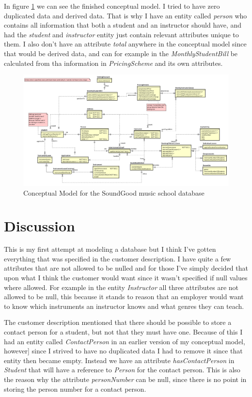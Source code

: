\documentclass[a4paper]{scrreprt}
\begin{document}
In figure \ref{fig:conceptualModel} we can see the finished conceptual model. I tried to have zero duplicated data and derived
data. That is why I have an entity called \textit{person} who contains all information that both a student and an instructor should have,
and had the \textit{student} and \textit{instructor} entity just contain relevant attributes unique to them. I also don't have
an attribute \textit{total} anywhere in the conceptual model since that would be derived data, and can for example in the
\textit{MonthlyStudentBill} be calculated from tha information in \textit{PricingScheme} and its own attributes.
\begin{figure}[h]
    \begin{center}
        \includegraphics[width=\textwidth]{../img/conceptualModel.v1.0.1.png}
        \caption{Conceptual Model for the SoundGood music school database}
        \label{fig:conceptualModel}
    \end{center}
\end{figure}

\chapter{Discussion}
This is my first attempt at modeling a database but I think I've gotten everything that was specified in the customer description.
I have quite a few attributes that are not allowed to be nulled and for those I've simply decided that upon what I think the
customer would want since it wasn't specified if null values where allowed. For example in the entity \textit{Instructor}
all three attributes are not allowed to be null, this because it stands to reason that an employer would want to know which
instruments an instructor knows and what genres they can teach.

The customer description mentioned that there should be possible to store a contact person for a student, but not that they
must have one. Because of this I had an entity called \textit{ContactPerson} in an earlier version of my conceptual model, however]
since I strived to have no duplicated data I had to remove it since that entity then became empty. Instead we have an attribute
\textit{hasContactPerson} in \textit{Student} that will have a reference to \textit{Person} for the contact person. This is also
the reason why the attribute \textit{personNumber} can be null, since there is no point in storing the person number for a
contact person.
\end{document}
